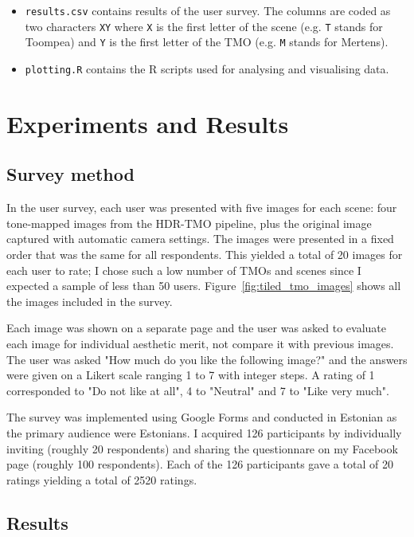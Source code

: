 \documentclass[a4paper]{scrartcl}
\begin{document}
\begin{itemize}

\item \texttt{results.csv} contains results of the user survey. The columns are coded as two characters \texttt{XY} where \texttt{X} is the first letter of the scene (e.g. \texttt{T} stands for Toompea) and \texttt{Y} is the first letter of the TMO (e.g. \texttt{M} stands for Mertens).
\item \texttt{plotting.R} contains the R scripts used for analysing and visualising data.

\end{itemize}

\newpage
\section{Experiments and Results}

\subsection{Survey method}

In the user survey, each user was presented with five images for each scene: four tone-mapped images from the HDR-TMO pipeline, plus the original image captured with automatic camera settings. The images were presented in a fixed order that was the same for all respondents. This yielded a total of 20 images for each user to rate; I chose such a low number of TMOs and scenes since I expected a sample of less than 50 users. Figure~\ref{fig:tiled_tmo_images} shows all the images included in the survey.

Each image was shown on a separate page and the user was asked to evaluate each image for individual aesthetic merit, not compare it with previous images. The user was asked "How much do you like the following image?" and the answers were given on a Likert scale ranging 1 to 7 with integer steps. A rating of 1 corresponded to "Do not like at all", 4 to "Neutral" and 7 to "Like very much".

The survey was implemented using Google Forms and conducted in Estonian as the primary audience were Estonians. I acquired 126 participants by individually inviting (roughly 20 respondents) and sharing the questionnare on my Facebook page (roughly 100 respondents). Each of the 126 participants gave a total of 20 ratings yielding a total of 2520 ratings. 

\subsection{Results}
\end{document}
